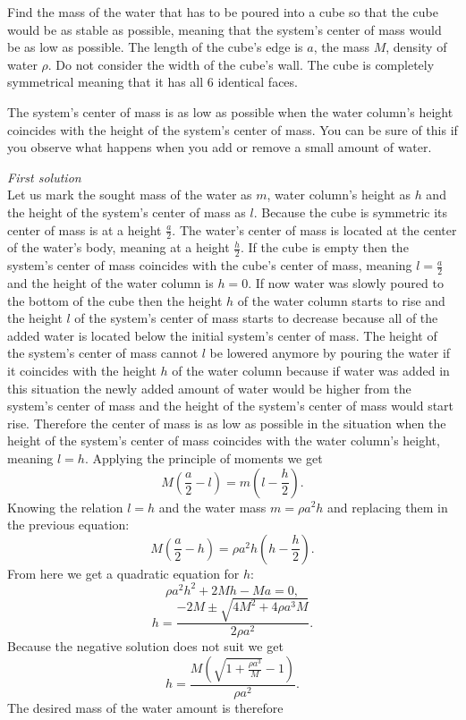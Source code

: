 {\ifEngStatement
Find the mass of the water that has to be poured into a cube so that the cube would be as stable as possible, meaning that the system’s center of mass would be as low as possible. The length of the cube’s edge is $a$, the mass $M$, density of water $\rho$. Do not consider the width of the cube’s wall. The cube is completely symmetrical meaning that it has all 6 identical faces.
\fi


\ifEngHint
The system’s center of mass is as low as possible when the water column’s height coincides with the height of the system’s center of mass. You can be sure of this if you observe what happens when you add or remove a small amount of water.
\fi


\ifEngSolution
\emph{First solution}\\
Let us mark the sought mass of the water as $m$, water column’s height as $h$ and the height of the system’s center of mass as $l$. Because the cube is symmetric its center of mass is at a height $\frac{a}{2}$. The water’s center of mass is located at the center of the water’s body, meaning at a height $\frac{h}{2}$. If the cube is empty then the system’s center of mass coincides with the cube’s center of mass, meaning $l=\frac{a}{2}$ and the height of the water column is $h=0$. If now water was slowly poured to the bottom of the cube then the height $h$ of the water column starts to rise and the height $l$ of the system’s center of mass starts to decrease because all of the added water is located below the initial system’s center of mass. The height of the system’s center of mass cannot $l$ be lowered anymore by pouring the water if it coincides with the height $h$ of the water column because if water was added in this situation the newly added amount of water would be higher from the system’s center of mass and the height of the system’s center of mass would start rise. Therefore the center of mass is as low as possible in the situation when the height of the system’s center of mass coincides with the water column’s height, meaning $l=h$. Applying the principle of moments we get
$$M(\frac{a}{2}-l)=m(l-\frac{h}{2}).$$
Knowing the relation $l=h$ and the water mass $m=\rho a^2h$ and replacing them in the previous equation:
$$M(\frac{a}{2}-h)=\rho a^2h(h-\frac{h}{2}).$$
From here we get a quadratic equation for $h$:
$$\rho a^2h^2+2Mh-Ma=0,$$
$$h=\frac{-2M \pm \sqrt{4M^2+4\rho a^3M}}{2\rho a^2}.$$
Because the negative solution does not suit we get
$$h=\frac{M(\sqrt{1+\frac{\rho a^3}{M}}-1)}{\rho a^2}.$$
The desired mass of the water amount is therefore
}
